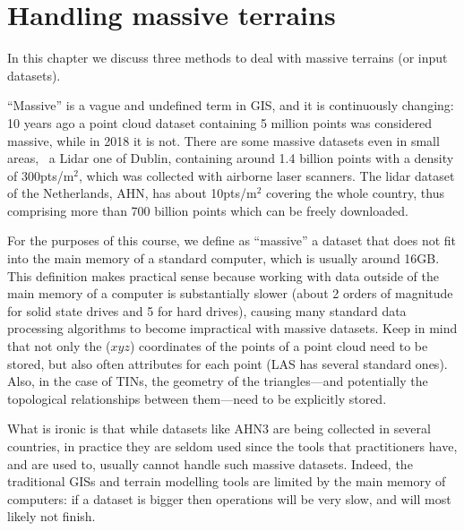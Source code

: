 
\setchapterpreamble[u]{\margintoc}

\chapter{Handling massive terrains}
\label{chap:massive}


\graphicspath{{massive/}}


In this chapter we discuss three methods to deal with massive terrains (or input datasets).

%

``Massive'' is a vague and undefined term in GIS, and it is continuously changing: 10 years ago a point cloud dataset containing 5 million points was considered massive, while in 2018 it is not.
There are some massive datasets even in small areas, \eg\ a Lidar one of Dublin, containing around 1.4 billion points with a density of 300pts/m$^2$, which was collected with airborne laser scanners.
The lidar dataset of the Netherlands, AHN, has about 10pts/m$^2$ covering the whole country, thus comprising more than 700 billion points which can be freely downloaded.

%

For the purposes of this course, we define as ``massive'' a dataset that does not fit into the main memory of a standard computer, which is usually around 16GB\@.
This definition makes practical sense because working with data outside of the main memory of a computer is substantially slower (about 2 orders of magnitude for solid state drives and 5 for hard drives), causing many standard data processing algorithms to become impractical with massive datasets.
Keep in mind that not only the ($xyz$) coordinates of the points of a point cloud need to be stored, but also often attributes for each point (LAS has several standard ones).
Also, in the case of TINs, the geometry of the triangles---and potentially the topological relationships between them---need to be explicitly stored.

%

What is ironic is that while datasets like AHN3 are being collected in several countries, in practice they are seldom used since the tools that practitioners have, and are used to, usually cannot handle such massive datasets. 
Indeed, the traditional GISs and terrain modelling tools are limited by the main memory of computers: if a dataset is bigger then operations will be very slow, and will most likely not finish.



